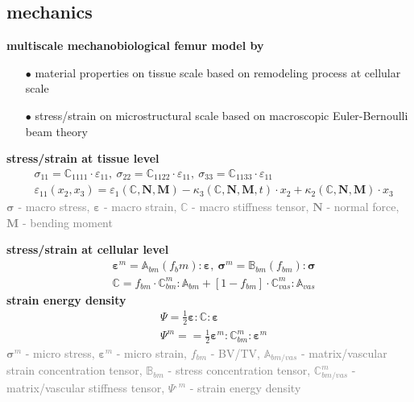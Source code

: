 \documentclass[%
aspectratio=169,  %
]{beamer}
\begin{document}
\subsection{mechanics}
\begin{frame}
\textbf{multiscale mechanobiological femur model by \cite{Lerebours.2016}}
\begin{itemize}
	\item [$\bullet$] material properties on tissue scale based on remodeling process at cellular scale
	\item[$\bullet$] stress/strain on microstructural scale based on macroscopic Euler-Bernoulli beam theory
\end{itemize}
\textbf{stress/strain at tissue level}
\begin{align}
	&\sigma_{11} = \mathbb{C}_{1111} \cdot\varepsilon_{11},~ \sigma_{22} = \mathbb{C}_{1122} \cdot \varepsilon_{11},~ \sigma_{33} = \mathbb{C}_{1133} \cdot \varepsilon_{11} \\
	&\varepsilon_{11} (x_2, x_3) = \varepsilon_1(\mathbb{C}, \mathbf{N}, \mathbf{M}) - \kappa_3(\mathbb{C}, \mathbf{N}, \mathbf{M},t) \cdot x_2 + \kappa_2(\mathbb{C}, \mathbf{N}, \mathbf{M}) \cdot x_3
\end{align}
\textcolor{gray}{$\bm{\sigma}$ - macro stress, $\bm{\varepsilon}$ - macro strain, $\mathbb{C}$ - macro stiffness tensor, $\mathbf{N}$ - normal force, $\mathbf{M}$ - bending moment }
\end{frame}

\begin{frame}
\textbf{stress/strain at cellular level}
\begin{align}
	&\bm{\varepsilon}^m = \mathbb{A}_{bm}(f_bm) :  \bm{\varepsilon},~ \bm{\sigma}^m = \mathbb{B}_{bm}(f_{bm}) :  \bm{\sigma} \\
	&\mathbb{C} = f_{bm} \cdot \mathbb{C}_{bm}^m : \mathbb{A}_{bm} + [1-f_{bm}] \cdot \mathbb{C}_{vas}^m : \mathbb{A}_{vas}
\end{align}
\textbf{strain energy density}
\begin{align}
	& \Psi = \frac{1}{2} \bm{\varepsilon} : \mathbb{C} :  \bm{\varepsilon}  \\
	& \Psi^m = = \frac{1}{2} \bm{\varepsilon}^m : \mathbb{C}^m_{bm} :  \bm{\varepsilon} ^m
\end{align}
\textcolor{gray}{$\bm{\sigma}^m$ - micro stress, $\bm{\varepsilon}^m$ - micro strain, $f_{bm}$ - BV/TV,  $\mathbb{A}_{bm/vas}$ - matrix/vascular strain concentration tensor, $\mathbb{B}_{bm}$ - stress concentration tensor, 
						$\mathbb{C}_{bm/vas}^m$ - matrix/vascular stiffness tensor, $\Psi^{,m}$ - strain energy density}
\end{frame}
\end{document}
